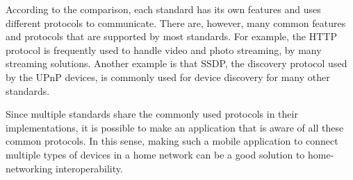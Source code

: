 \begin{table}[htb] 
\caption{Advanced feature comparison \label{advanced_feature_cmp}} 
\begin{center} 
\end{center} 
\end{table} 

According to the comparison, each standard has its own features and uses 
different protocols to communicate. There are, however, many common features and protocols that are supported by most standards. For example, the HTTP protocol is frequently used to handle video 
and photo streaming, by many streaming solutions. Another example is that SSDP, the discovery protocol used by the UPnP devices, is commonly used for device discovery for many other standards.

Since multiple standards share the commonly used protocols in their implementations, it is possible to make an application that is aware of all these common protocols. In this sense, making such a mobile application to connect multiple types of devices in a home network can be a good solution to home-networking interoperability. 
